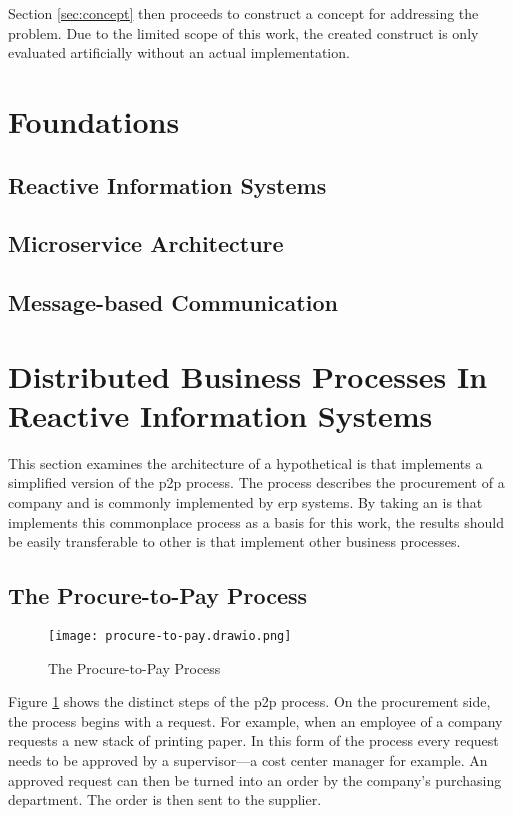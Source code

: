 Section \ref{sec:concept} then proceeds to construct a concept for addressing the problem.
Due to the limited scope of this work, the created construct is only evaluated artificially without an actual implementation.

\section{Foundations}\label{sec:foundations}

\subsection{Reactive Information Systems}

\subsection{Microservice Architecture}

\subsection{Message-based Communication}

\section{Distributed Business Processes In Reactive Information Systems}\label{sec:problem}

This section examines the architecture of a hypothetical \gls{is} that implements a simplified version of the \gls{p2p} process.
The process describes the procurement of a company and is commonly implemented by \gls{erp} systems.
By taking an \gls{is} that implements this commonplace process as a basis for this work, the results should be easily transferable to other \gls{is} that implement other business processes.

\subsection{The Procure-to-Pay Process}

\begin{figure}[H]
  \centering
  \texttt{[image: procure-to-pay.drawio.png]}
  \caption{The Procure-to-Pay Process}\label{fig:procure-to-pay}
\end{figure}

Figure \ref{fig:procure-to-pay} shows the distinct steps of the \gls{p2p} process.
On the procurement side, the process begins with a request.
For example, when an employee of a company requests a new stack of printing paper.
In this form of the process every request needs to be approved by a supervisor---a cost center manager for example.
An approved request can then be turned into an order by the company's purchasing department.
The order is then sent to the supplier.

